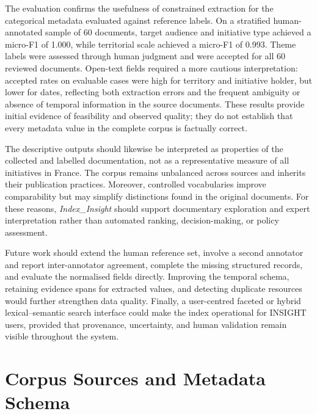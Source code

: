 \documentclass[
11pt,
english,
singlespacing,
headsepline,
]{MastersDoctoralThesis}
\begin{document}
The evaluation confirms the usefulness of constrained extraction for the
categorical metadata evaluated against reference labels. On a stratified
human-annotated sample of 60 documents, target audience and initiative type
achieved a micro-F1 of 1.000, while territorial scale achieved a micro-F1 of
0.993. Theme labels were assessed through human judgment and were accepted for
all 60 reviewed documents. Open-text fields required a more cautious
interpretation: accepted rates on evaluable cases were high for territory and
initiative holder, but lower for dates, reflecting both extraction errors and
the frequent ambiguity or absence of temporal information in the source
documents. These results provide initial evidence of feasibility and observed
quality; they do not establish that every metadata value in the complete corpus
is factually correct.

The descriptive outputs should likewise be interpreted as properties of the collected and labelled documentation, not as a representative measure of all initiatives in France. The corpus remains unbalanced across sources and inherits their publication practices. Moreover, controlled vocabularies improve comparability but may simplify distinctions found in the original documents. For these reasons, \textit{Index\_Insight} should support documentary exploration and expert interpretation rather than automated ranking, decision-making, or policy assessment.

Future work should extend the human reference set, involve a second annotator and report inter-annotator agreement, complete the missing structured records, and evaluate the normalised fields directly. Improving the temporal schema, retaining evidence spans for extracted values, and detecting duplicate resources would further strengthen data quality. Finally, a user-centred faceted or hybrid lexical--semantic search interface could make the index operational for INSIGHT users, provided that provenance, uncertainty, and human validation remain visible throughout the system. 



\appendix

\chapter{Corpus Sources and Metadata Schema}
\end{document}
